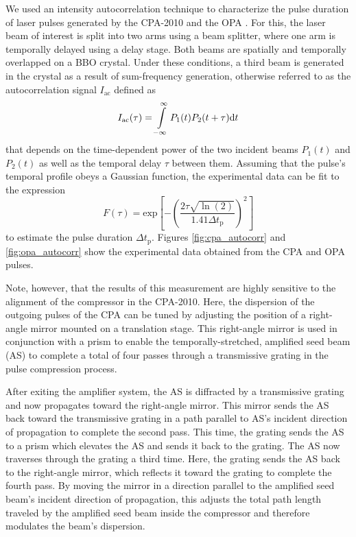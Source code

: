 We used an intensity autocorrelation technique to characterize the pulse duration of laser pulses generated by the CPA-2010 and the OPA \cite{paschotta2008field}. For this, the laser beam of interest is split into two arms using a beam splitter, where one arm is temporally delayed using a delay stage. Both beams are spatially and temporally overlapped on a BBO crystal. Under these conditions, a third beam is generated in the crystal as a result of sum-frequency generation, otherwise referred to as the autocorrelation signal $I_\text{ac}$ defined as
%
\begin{equation}
	I_\text{ac}(\tau) = \int\displaylimits_{-\infty}^{\infty} P_1(t)P_2(t+\tau) \text{d}t
\end{equation}
%
that depends on the time-dependent power of the two incident beams $P_1(t)$ and $P_2(t)$ as well as the temporal delay $\tau$ between them. Assuming that the pulse's temporal profile obeys a Gaussian function, the experimental data can be fit to the expression
%
\begin{equation}
	F(\tau) = \mathrm{ exp}\left[ - \left( \dfrac{2\tau\sqrt{\ln (2)}}{1.41 \Delta t_\text{p}} \right)^2\right]
	\label{eq:pulse_duration_fit}
\end{equation}
%
to estimate the pulse duration $\Delta t_\text{p}$. Figures \ref{fig:cpa_autocorr} and \ref{fig:opa_autocorr} show the experimental data obtained from the CPA and OPA pulses.

Note, however, that the results of this measurement are highly sensitive to the alignment of the compressor in the CPA-2010. Here, the dispersion of the outgoing pulses of the CPA can be tuned by adjusting the position of a right-angle mirror mounted on a translation stage. This right-angle mirror is used in conjunction with a prism to enable the temporally-stretched, amplified seed beam (AS) to complete a total of four passes through a transmissive grating in the pulse compression process.

After exiting the amplifier system, the AS is diffracted by a transmissive grating and now propagates toward the right-angle mirror. This mirror sends the AS back toward the transmissive grating in a path parallel to AS's incident direction of propagation to complete the second pass. This time, the grating sends the AS to a prism which elevates the AS and sends it back to the grating. The AS now traverses through the grating a third time. Here, the grating sends the AS back to the right-angle mirror, which reflects it toward the grating to complete the fourth pass. By moving the mirror in a direction parallel to the amplified seed beam's incident direction of propagation, this adjusts the total path length traveled by the amplified seed beam inside the compressor and therefore modulates the beam's dispersion.

